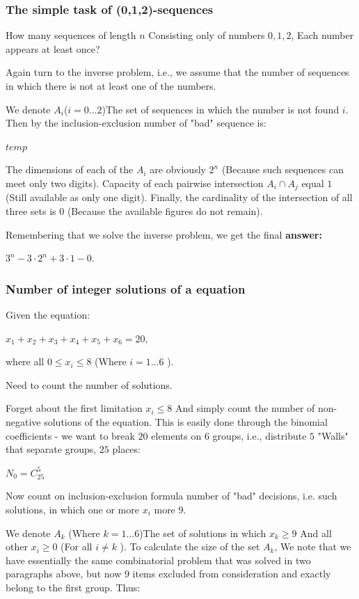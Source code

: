 \subsubsection{ The simple task of (0,1,2)-sequences }

How many sequences of length $n$ Consisting only of numbers $0,1,2$, Each number appears at least once?

Again turn to the inverse problem, i.e., we assume that the number of sequences in which there is not at least one of the numbers.

We denote $A_i$($i = 0 \ldots 2$)The set of sequences in which the number is not found $i$. Then by the inclusion-exclusion number of "bad" sequence is:

$temp$

The dimensions of each of the $A_i$ are obviously $2 ^ n$ (Because such sequences can meet only two digits). Capacity of each pairwise intersection $A_i \cap A_j$ equal $1$ (Still available as only one digit). Finally, the cardinality of the intersection of all three sets is $0$ (Because the available figures do not remain).

Remembering that we solve the inverse problem, we get the final \textbf{answer:}

$3 ^ n - 3 \cdot 2 ^ n + 3 \cdot 1 - 0.$

\subsubsection{ Number of integer solutions of a equation }

Given the equation:

$x_1 + x_2 + x_3 + x_4 + x_5 + x_6 = 20,$

where all $0 \le x_i \le 8$ (Where $i = 1 \ldots 6$ ).

Need to count the number of solutions.

Forget about the first limitation $x_i \le 8$ And simply count the number of non-negative solutions of the equation. This is easily done through the binomial coefficients - we want to break $20$ elements on $6$ groups, i.e., distribute $5$ "Walls" that separate groups, $25$ places:

$N_0 = C_ {25} ^ 5$

Now count on inclusion-exclusion formula number of "bad" decisions, i.e. such solutions, in which one or more $x_i$ more $9$.

We denote $A_k$ (Where $k = 1 \ldots 6$)The set of solutions in which $x_k \ge 9$ And all other $x_i \ge 0$ (For all $i \ne k$ ). To calculate the size of the set $A_k$, We note that we have essentially the same combinatorial problem that was solved in two paragraphs above, but now $9$ items excluded from consideration and exactly belong to the first group. Thus:

